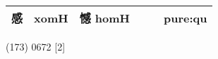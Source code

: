 \documentclass[14pt,a4paper]{scrartcl}
\begin{document}
\begin{longtable}[c]{@{}llllll@{}}
\begin{minipage}[t]{0.14\columnwidth}
感
\strut\end{minipage} &
\begin{minipage}[t]{0.14\columnwidth}\raggedright\strut
xomH
\strut\end{minipage} &
\begin{minipage}[t]{0.14\columnwidth}\raggedright\strut
憾 homH
\strut\end{minipage} &
\begin{minipage}[t]{0.14\columnwidth}\raggedright\strut
\strut\end{minipage} &
\begin{minipage}[t]{0.14\columnwidth}\raggedright\strut
\strut\end{minipage} &
\begin{minipage}[t]{0.14\columnwidth}\raggedright\strut
pure:qu
\strut\end{minipage}\tabularnewline
\bottomrule
\end{longtable}

(173) 0672 {[}2{]}
\end{document}
